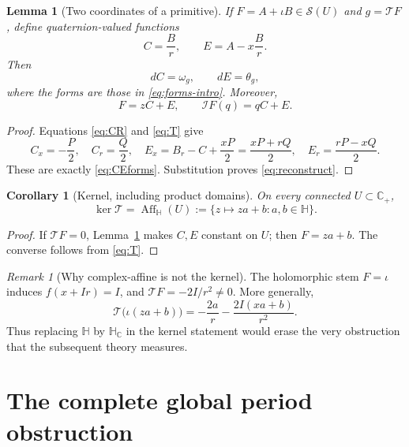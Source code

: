\documentclass[11pt,a4paper]{article}
\numberwithin{equation}{section}
\newtheorem{lemma}[theorem]{Lemma}
\newtheorem{corollary}[theorem]{Corollary}
\theoremstyle{definition}
\theoremstyle{remark}
\newtheorem{remark}[theorem]{Remark}
\newcommand{\C}{\mathbb C}
\newcommand{\HH}{\mathbb H}
\newcommand{\HC}{\mathbb H_{\C}}
\newcommand{\Cp}{\C_+}
\newcommand{\cS}{\mathscr S}
\newcommand{\cI}{\mathcal I}
\newcommand{\T}{\mathcal T}
\newcommand{\Aff}{\operatorname{Aff}_{\HH}}
\begin{document}
\begin{lemma}[Two coordinates of a primitive]
\label{lem:coordinates}
If $F=A+\iota B\in\cS(U)$ and $g=\T F$, define quaternion-valued functions
\begin{equation}
 C=\frac Br,\qquad E=A-x\frac Br.
 \label{eq:CE}
\end{equation}
Then
\begin{equation}
 dC=\omega_g,\qquad dE=\theta_g,
 \label{eq:CEforms}
\end{equation}
where the forms are those in \eqref{eq:forms-intro}. Moreover,
\begin{equation}
 F=zC+E,\qquad \cI F(q)=qC+E.
 \label{eq:reconstruct}
\end{equation}
\end{lemma}
\begin{proof}
Equations \eqref{eq:CR} and \eqref{eq:T} give
\[
 C_x=-\frac P2,\quad C_r=\frac Q2,\quad
 E_x=B_r-C+\frac{xP}{2}=\frac{xP+rQ}{2},\quad
 E_r=\frac{rP-xQ}{2}.
\]
These are exactly \eqref{eq:CEforms}. Substitution proves
\eqref{eq:reconstruct}.
\end{proof}

\begin{corollary}[Kernel, including product domains]
\label{cor:kernel}
On every connected $U\subset\Cp$,
\[
 \ker\T=\Aff(U):=\{z\mapsto za+b:a,b\in\HH\}.
\]
\end{corollary}
\begin{proof}
If $\T F=0$, Lemma~\ref{lem:coordinates} makes $C,E$ constant on $U$;
then $F=za+b$. The converse follows from \eqref{eq:T}.
\end{proof}

\begin{remark}[Why complex-affine is not the kernel]
\label{rem:complexaffine}
The holomorphic stem $F=\iota$ induces $f(x+Ir)=I$, and
$\T F=-2I/r^2\ne0$. More generally,
\begin{equation}
 \T\bigl(\iota(za+b)\bigr)
 =-\frac{2a}{r}-\frac{2I(xa+b)}{r^2}.
 \label{eq:imag-affine}
\end{equation}
Thus replacing $\HH$ by $\HC$ in the kernel statement would erase the
very obstruction that the subsequent theory measures.
\end{remark}

\section{The complete global period obstruction}
\label{sec:periods}
\end{document}
